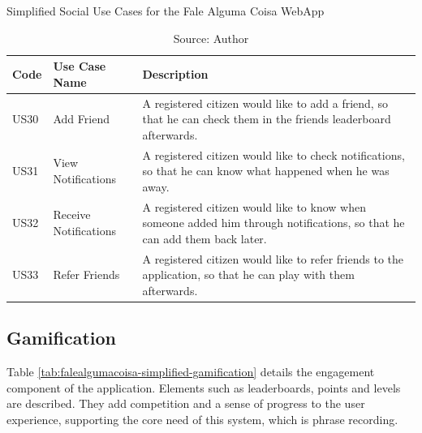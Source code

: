 \begin{table}[h]
\caption{Simplified Social Use Cases for the Fale Alguma Coisa WebApp}
\label{tab:falealgumacoisa-simplified-social}
\centering
\begin{tabular}{|p{1cm}|p{3cm}|p{10cm}|}
\hline
    Code & Use Case Name & Description \\ \hline
    US30 & Add Friend & A registered citizen would like to add a friend, so that he can check them in the friends leaderboard afterwards. \\ \hline
    US31 & View Notifications & A registered citizen would like to check notifications, so that he can know what happened when he was away. \\ \hline
    US32 & Receive Notifications & A registered citizen would like to know when someone added him through notifications, so that he can add them back later. \\ \hline
    US33 & Refer Friends & A registered citizen would like to refer friends to the application, so that he can play with them afterwards. \\ \hline
\end{tabular}
\caption*{Source: Author}
\end{table}

\subsection{Gamification}

Table \ref{tab:falealgumacoisa-simplified-gamification} details the engagement component of the application. Elements such as leaderboards, points and levels are described. They add competition and a sense of progress to the user experience, supporting the core need of this system, which is phrase recording.

